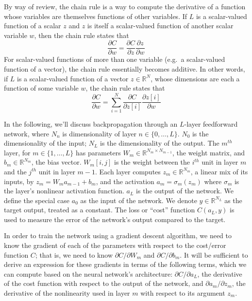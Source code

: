 By way of review, the chain rule is a way to compute the derivative of a function whose variables are themselves functions of other variables.
If $L$ is a scalar-valued function of a scalar $z$ and $z$ is itself a scalar-valued function of another scalar variable $w$, then the chain rule states that
\begin{equation}
\frac{\partial C}{\partial w} = \frac{\partial C}{\partial z}\frac{\partial z}{\partial w}
\end{equation}
For scalar-valued functions of more than one variable (e.g.\ a scalar-valued function of a vector), the chain rule essentially becomes additive.
In other words, if $L$ is a scalar-valued function of a vector $z \in \mathbb{R}^N$, whose dimensions are each a function of some variable $w$, the chain rule states that
\begin{equation}
\frac{\partial C}{\partial w} = \sum_{i = 1}^N \frac{\partial C}{\partial z[i]}\frac{\partial z[i]}{\partial w}
\end{equation}

In the following, we'll discuss backpropagation through an $L$-layer feedforward network, where $N_n$ is dimensionality of layer $n \in \{0, \ldots, L\}$.
$N_0$ is the dimensionality of the input; $N_L$ is the dimensionality of the output.
The $m^{th}$ layer, for $m \in \{1, \ldots, L\}$ has parameters $W_m \in \mathbb{R}^{N_m \times N_{m - 1}}$, the weight matrix, and $b_m \in \mathbb{R}^{N_m}$, the bias vector.
$W_m[i, j]$ is the weight between the $i^{th}$ unit in layer $m$ and the $j^{th}$ unit in layer $m - 1$.
Each layer computes $z_m \in \mathbb{R}^{N_m}$, a linear mix of its inputs, by $z_m = W_m a_{m - 1} + b_m$, and the activation $a_m = \sigma_m(z_m)$ where $\sigma_m$ is the layer's nonlinear activation function.
$a_L$ is the output of the network.
We define the special case $a_0$ as the input of the network.
We denote $y \in \mathbb{R}^{N_L}$ as the target output, treated as a constant.
The loss or ``cost'' function $C(a_L, y)$ is used to measure the error of the network's output compared to the target.

In order to train the network using a gradient descent algorithm, we need to know the gradient of each of the parameters with respect to the cost/error function $C$; that is, we need to know $\partial C/\partial W_m$ and $\partial C/\partial b_m$.
It will be sufficient to derive an expression for these gradients in terms of the following terms, which we can compute based on the neural network's architecture: $\partial C/\partial a_L$, the derivative of the cost function with respect to the output of the network, and $\partial a_m/\partial z_m$, the derivative of the nonlinearity used in layer $m$ with respect to its argument $z_m$.

